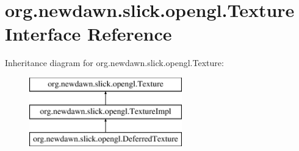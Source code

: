 \hypertarget{interfaceorg_1_1newdawn_1_1slick_1_1opengl_1_1_texture}{}\section{org.\+newdawn.\+slick.\+opengl.\+Texture Interface Reference}
\label{interfaceorg_1_1newdawn_1_1slick_1_1opengl_1_1_texture}
Inheritance diagram for org.\+newdawn.\+slick.\+opengl.\+Texture\+:\begin{figure}[H]
\begin{center}
\leavevmode
\includegraphics[height=3.000000cm]{interfaceorg_1_1newdawn_1_1slick_1_1opengl_1_1_texture}
\end{center}
\end{figure}
